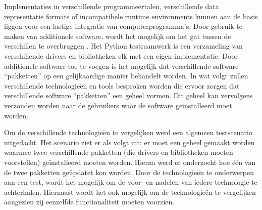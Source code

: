 Implementaties in verschillende programmeertalen, verschillende data representatie formats of incompatibele runtime environments kunnen aan de basis liggen voor een lastige integratie van computerprogramma's.
Door gebruik te maken van additionele software, wordt het mogelijk om het gat tussen de verschillen te overbruggen  \citep{callahan1998software}.
Het Python testraamwerk is een verzameling van verschillende drivers en bibliotheken elk met een eigen implementatie.
Door additionele software toe te voegen is het mogelijk dat verschillende software ``pakketten'' op een gelijkaardige manier behandelt worden.
In wat volgt zullen verschillende technologieën en tools besproken worden die ervoor zorgen dat verschillende software ``pakketten'' een geheel vormen.
Dit geheel kan vervolgens verzonden worden naar de gebruikers waar de software geïnstalleerd moet worden.

Om de verschillende technologieën te vergelijken werd een algemeen testscenario uitgedacht.
Het scenario ziet er als volgt uit: er moet een geheel gemaakt worden waarmee twee verschillende pakketten (die drivers en bibliotheken moeten voorstellen) geïnstalleerd moeten worden.
Hierna werd er onderzocht hoe één van de twee pakketten geüpdatet kon worden.
Door de technologieën te onderwerpen aan een test, wordt het mogelijk om de voor- en nadelen van iedere technologie te achterhalen.
Hiernaast wordt het ook mogelijk om de technologieën te vergelijken aangezien zij eenzelfde functionaliteit moeten voorzien.

